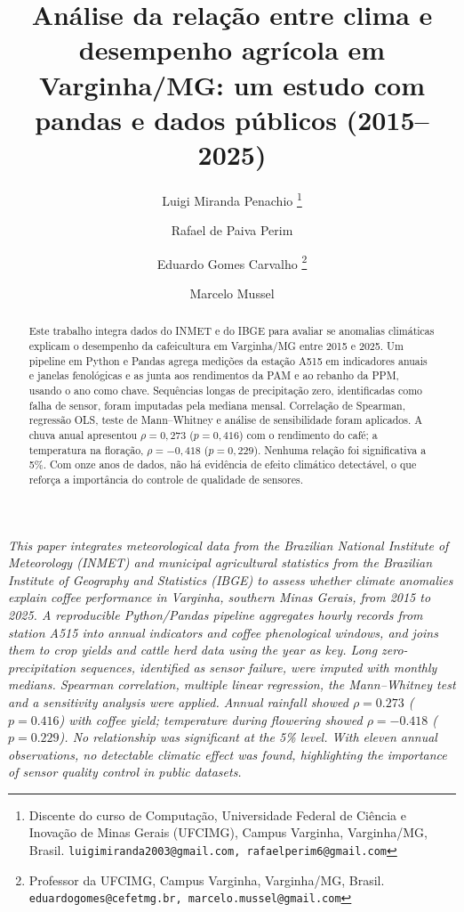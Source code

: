 \documentclass{RITA}
\title{An\'alise da rela\c{c}\~ao entre clima e desempenho agr\'icola em Varginha/MG: um estudo com pandas e dados p\'ublicos (2015--2025)}
\author{
  Luigi Miranda Penachio
    \footnote{Discente do curso de Computa\c{c}\~ao, Universidade Federal de Ci\^encia e Inova\c{c}\~ao de Minas Gerais (UFCIMG), Campus Varginha, Varginha/MG, Brasil. \texttt{luigimiranda2003@gmail.com, rafaelperim6@gmail.com}}
  \and
  Rafael de Paiva Perim
    \footnotemark[1]
  \and
  Eduardo Gomes Carvalho
    \footnote{Professor da UFCIMG, Campus Varginha, Varginha/MG, Brasil. \texttt{eduardogomes@cefetmg.br, marcelo.mussel@gmail.com}}
  \and
  Marcelo Mussel
    \footnotemark[2]
}
\begin{document}
\maketitle


\begin{abstract}
Este trabalho integra dados do INMET e do IBGE para avaliar se anomalias clim\'aticas explicam o desempenho da cafeicultura em Varginha/MG entre 2015 e 2025. Um pipeline em Python e Pandas agrega medi\c{c}\~oes da esta\c{c}\~ao A515 em indicadores anuais e janelas fenol\'ogicas e as junta aos rendimentos da PAM e ao rebanho da PPM, usando o ano como chave. Sequ\^encias longas de precipita\c{c}\~ao zero, identificadas como falha de sensor, foram imputadas pela mediana mensal. Correla\c{c}\~ao de Spearman, regress\~ao OLS, teste de Mann--Whitney e an\'alise de sensibilidade foram aplicados. A chuva anual apresentou $\rho=0,273$ ($p=0,416$) com o rendimento do caf\'e; a temperatura na flora\c{c}\~ao, $\rho=-0,418$ ($p=0,229$). Nenhuma rela\c{c}\~ao foi significativa a 5\%. Com onze anos de dados, n\~ao h\'a evid\^encia de efeito clim\'atico detect\'avel, o que refor\c{c}a a import\^ancia do controle de qualidade de sensores.
\end{abstract}

\begin{abstractinenglish}
\emph{This paper integrates meteorological data from the Brazilian National Institute of Meteorology (INMET) and municipal agricultural statistics from the Brazilian Institute of Geography and Statistics (IBGE) to assess whether climate anomalies explain coffee performance in Varginha, southern Minas Gerais, from 2015 to 2025. A reproducible Python/Pandas pipeline aggregates hourly records from station A515 into annual indicators and coffee phenological windows, and joins them to crop yields and cattle herd data using the year as key. Long zero-precipitation sequences, identified as sensor failure, were imputed with monthly medians. Spearman correlation, multiple linear regression, the Mann--Whitney test and a sensitivity analysis were applied. Annual rainfall showed $\rho=0.273$ ($p=0.416$) with coffee yield; temperature during flowering showed $\rho=-0.418$ ($p=0.229$). No relationship was significant at the 5\% level. With eleven annual observations, no detectable climatic effect was found, highlighting the importance of sensor quality control in public datasets.}
\end{abstractinenglish}
\end{document}
